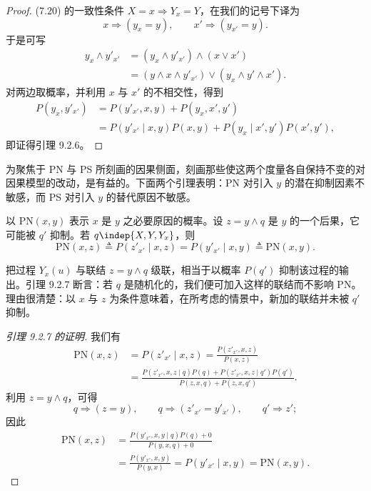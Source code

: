 \begin{proof}
(7.20) 的一致性条件 $X=x\Rightarrow Y_x=Y$，在我们的记号下译为
\[
x\Rightarrow(y_x=y),\qquad x'\Rightarrow(y_{x'}=y).
\]
于是可写
\begin{align*}
y_x\wedge y'_{x'} &= (y_x\wedge y'_{x'})\wedge(x\vee x')\\
&= (y\wedge x\wedge y'_{x'})\vee(y_x\wedge y'\wedge x').
\end{align*}
对两边取概率，并利用 $x$ 与 $x'$ 的不相交性，得到
\begin{align*}
P(y_x,y'_{x'}) &= P(y'_{x'},x,y)+P(y_x,x',y')\\
&= P(y'_{x'}\mid x,y)P(x,y)+P(y_x\mid x',y')P(x',y'),
\end{align*}
即证得引理 9.2.6。
\end{proof}

为聚焦于 PN 与 PS 所刻画的因果侧面，刻画那些使这两个度量各自保持不变的对因果模型的改动，是有益的。下面两个引理表明：PN 对引入 $y$ 的潜在抑制因素不敏感，而 PS 对引入 $y$ 的替代原因不敏感。

\begin{lemma}
以 $\mathrm{PN}(x,y)$ 表示 $x$ 是 $y$ 之必要原因的概率。设 $z=y\wedge q$ 是 $y$ 的一个后果，它可能被 $q'$ 抑制。若 $q\indep\{X,Y,Y_x\}$，则
\[
\mathrm{PN}(x,z)\triangleq P(z'_{x'}\mid x,z)=P(y'_{x'}\mid x,y)\triangleq\mathrm{PN}(x,y).
\]
\end{lemma}

把过程 $Y_x(u)$ 与联结 $z=y\wedge q$ 级联，相当于以概率 $P(q')$ 抑制该过程的输出。引理 9.2.7 断言：若 $q$ 是随机化的，我们便可加入这样的联结而不影响 PN。理由很清楚：以 $x$ 与 $z$ 为条件意味着，在所考虑的情景中，新加的联结并未被 $q'$ 抑制。

\begin{proof}[引理 9.2.7 的证明]
我们有
\begin{equation}
\begin{aligned}
\mathrm{PN}(x,z) &= P(z'_{x'}\mid x,z)=\frac{P(z'_{x'},x,z)}{P(x,z)}\\
&= \frac{P(z'_{x'},x,z\mid q)P(q)+P(z'_{x'},x,z\mid q')P(q')}{P(z,x,q)+P(z,x,q')}.
\end{aligned} \tag{9.6}
\end{equation}
利用 $z=y\wedge q$，可得
\[
q\Rightarrow(z=y),\qquad q\Rightarrow(z'_{x'}=y'_{x'}),\qquad q'\Rightarrow z';
\]
因此
\begin{align*}
\mathrm{PN}(x,z) &= \frac{P(y'_{x'},x,y\mid q)P(q)+0}{P(y,x,q)+0}\\
&= \frac{P(y'_{x'},x,y)}{P(y,x)}=P(y'_{x'}\mid x,y)=\mathrm{PN}(x,y).
\end{align*}
\end{proof}

